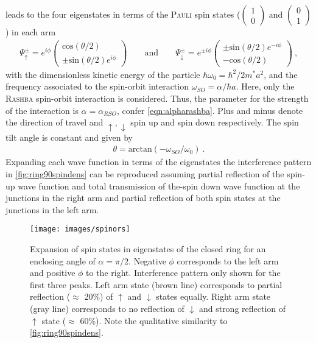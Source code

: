 leads to the four eigenstates in terms of the \textsc{Pauli} spin states ($\begin{pmatrix}1\\0\end{pmatrix}$ and $\begin{pmatrix}0\\1\end{pmatrix}$) in each arm \cite{nitta1999.695}
\begin{align}
  \Psi^{\pm}_{\uparrow} = e^{i\phi}\begin{pmatrix}\text{cos}(\theta/2)\\\pm\text{sin}(\theta/2)e^{i\phi}\end{pmatrix} 
  \qquad\text{and}\qquad
  \Psi^{\pm}_{\downarrow} = e^{\pm i\phi}\begin{pmatrix}\pm\text{sin}(\theta/2)e^{-i\phi}\\-\text{cos}(\theta/2)\end{pmatrix}\ ,
\end{align}
with the dimensionless kinetic energy of the particle $\hbar\omega_0=\hbar^2/2m^*a^2$, and the frequency associated to the spin-orbit interaction $\omega_{SO} = \alpha/\hbar a$. Here, only the \textsc{Rashba} spin-orbit interaction is considered. Thus, the parameter for the strength of the interaction is $\alpha = \alpha_{RSO}$, confer \cref{eqn:alpharashba}. Plus and minus denote the direction of travel and $\uparrow,\downarrow$ spin up and spin down respectively. The spin tilt angle is constant and given by \cite{PhysRevB.71.033309}
\begin{align}
\theta = \text{arctan}(-\omega_{SO}/\omega_0)\ .
\end{align}
Expanding each wave function in terms of the eigenstates the interference pattern in \cref{fig:ring90spindens} can be reproduced assuming partial reflection of the spin-up wave function and total transmission of the-spin down wave function at the junctions in the right arm and partial reflection of both spin states at the junctions in the left arm.
\begin{figure}[!h]
  \centering
  \texttt{[image: images/spinors]}
  \caption{Expansion of spin states in eigenstates of the closed ring for an enclosing angle of $\alpha = \pi/2$. Negative $\phi$ corresponds to the left arm and positive $\phi$ to the right. Interference pattern only shown for the first three peaks. Left arm state (brown line) corresponds to partial reflection ($\approx$ 20\%) of $\uparrow$ and $\downarrow$ states equally. Right arm state (gray line) corresponds to no reflection of $\downarrow$ and strong reflection of $\uparrow$ state ($\approx$ 60\%). Note the qualitative similarity to \cref{fig:ring90spindens}.}
\end{figure}
